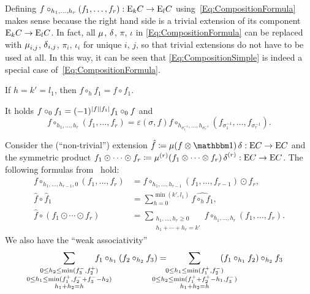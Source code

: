 \documentclass[\MainFolder/Text.tex]{subfiles}
\begin{document}
\begin{Remark}\label{Rem:Compositions}
\begin{RemarkList}
\item Defining $f\circ_{h_1, \dotsc, h_r}(f_1, \dotsc, f_r): \mathrm{E}_k C \rightarrow \mathrm{E}_l C$ using~\eqref{Eq:CompositionFormula} makes sense because the right hand side is a trivial extension of its component $\mathrm{E}_k C \rightarrow \mathrm{E}_l C$. In fact, all $\operatorname{\mu}$, $\operatorname{\delta}$, $\pi$, $\iota$ in \eqref{Eq:CompositionFormula} can be replaced with $\operatorname{\mu}_{i,j}$, $\operatorname{\delta}_{i,j}$, $\pi_i$, $\iota_i$ for unique $i$, $j$, so that trivial extensions do not have to be used at all. In this way, it can be seen that \eqref{Eq:CompositionSimple} is indeed a special case of~\eqref{Eq:CompositionFormula}. 
\item If $h = k' = l_1$, then $f \circ_{h} f_1 = f\circ f_1$.
\item It holds $f \circ_0 f_1 = (-1)^{|f||f_1|} f_1 \circ_0 f$ and 
\[ f\circ_{h_1,\dotsc,h_r}(f_1,\dotsc,f_r) = \varepsilon(\sigma,f) f\circ_{h_{\sigma_1^{-1}},\dotsc,h_{\sigma_r^{-1}}}(f_{\sigma_1^{-1}},\dotsc,f_{\sigma_r^{-1}}). \]
\item Consider the (``non-trivial'') extension $\hat{f}\coloneqq \Prod(f\otimes \Id)\CoProd: \Ext C \rightarrow \Ext C$ and the symmetric product $f_1 \odot \dotsb \odot f_r \coloneqq \operatorname{\mu}^{(r)}(f_1 \otimes \dotsb \otimes f_r)\operatorname{\delta}^{(r)}: \mathrm{E} C \rightarrow \mathrm{E} C$. The following formulas from~\cite{Cieliebak2015} hold:
\begin{equation} \label{Eq:Mix}
\begin{aligned}
f\circ_{h_1,\dotsc,h_{r-1},0}(f_1,\dotsc, f_r) &= f\circ_{h_1,\dotsc, h_{r-1}}(f_1,\dotsc, f_{r-1}) \odot f_r, \\
\hat{f} \circ \hat{f}_1 &= \sum_{h = 0}^{\min(k',l_1)} \widehat{f\circ_h f_1}, \\ 
   \hat{f} \circ (f_1 \odot \dotsb \odot f_r) &= \sum_{\substack{h_1, \dotsc, h_r \ge 0 \\ h_1 + \dotsb + h_r = k'}} f\circ_{h_1,\dotsc, h_r}(f_1,\dotsc, f_r).
\end{aligned}
\end{equation}
We also have the ``weak associativity''
\begin{equation}\label{Eq:WeakAssoc}
\qquad\qquad \mathclap{\sum_{\substack{0 \le h_2 \le \min(f_3^-, f_2^+) \\
0 \le h_1 \le \min(f_1^+,f_2^- + f_3^- - h_2) \\
h_1 + h_2 = h}}}\quad\qquad f_1 \circ_{h_1} (f_2 \circ_{h_2} f_3) = \qquad\quad \mathclap{\sum_{\substack{0 \le h_1 \le \min(f_1^+,f_2^-) \\ 0 \le h_2 \le \min(f_1^+ + f_2^+ - h_1, f_3^-) \\ h_1 + h_2 = h}}}\qquad\quad (f_1 \circ_{h_1} f_2) \circ_{h_2} f_3

\end{equation}
\end{RemarkList}
\end{Remark}
\end{document}
